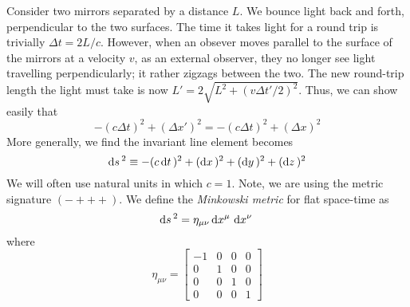Consider two mirrors separated by a distance \(L\). We bounce light back and forth, perpendicular to the two surfaces. The time it takes light for a round trip is trivially \(\Delta t = 2L/c\). However, when an obsever moves parallel to the surface of the mirrors at a velocity \(v\), as an external observer, they no longer see light travelling perpendicularly; it rather zigzags between the two. The new round-trip length the light must take is now \(L'=2\sqrt{L^2+(v\Delta t'/2)^2}\). Thus, we can show easily that
\[-(c\Delta t)^2 + (\Delta x')^2 = -(c\Delta t)^2+(\Delta x)^2\]
More generally, we find the invariant line element becomes
\begin{equation}
	\d{s}^2 \equiv -(c\d{t})^2+(\d{x})^2+(\d{y})^2+(\d{z})^2
\end{equation}
We will often use natural units in which \(c=1\). Note, we are using the metric signature \((-+++)\). We define the \emph{Minkowski metric} for flat space-time as
\begin{equation}
	\d{s}^2 = \eta_{\mu\nu}\d{x^\mu}\d{x^\nu}
\end{equation}
where
\begin{equation}
	\eta_{\mu\nu}=\begin{bmatrix}
		-1 & 0 & 0 & 0\\
		 0 & 1 & 0 & 0 \\
		 0 & 0 & 1 & 0\\
		 0 & 0 & 0 & 1
	\end{bmatrix}
\end{equation}

